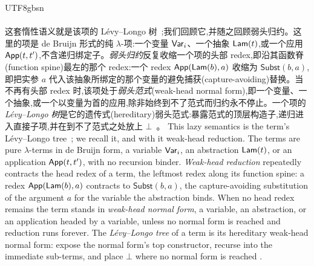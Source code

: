 \begin{CJK*}{UTF8}{gbsn}
  \paragraph{}
  \ifTablambdaChinese
  这套惰性语义就是该项的 Lévy--Longo 树~\cite{longo1983-set-theoretical-models, levy1978-reductions-lambda-calcul};我们回顾它,并随之回顾弱头归约。这里的项是 de Bruijn 形式的纯 $\lambda$-项:一个变量 $\mathsf{Var}_i$、一个抽象 $\mathsf{Lam}(t)$,或一个应用 $\mathsf{App}(t, t')$,不含递归绑定子。\emph{弱头归约}反复收缩一个项的头部 redex,即沿其函数脊(function spine)最左的那个 redex:一个 redex $\mathsf{App}(\mathsf{Lam}(b), a)$ 收缩为 $\textsf{Subst}(b, a)$,即把实参 $a$ 代入该抽象所绑定的那个变量的避免捕获(capture-avoiding)替换。当不再有头部 redex 时,该项处于\emph{弱头范式}(weak-head normal form),即一个变量、一个抽象,或一个以变量为首的应用,除非始终到不了范式而归约永不停止。一个项的 \emph{Lévy--Longo 树}是它的遗传式(hereditary)弱头范式:暴露范式的顶层构造子,递归进入直接子项,并在到不了范式之处放上 $\bot$~\cite{barendregt1984-lambda-calculus, wadsworth1971-semantics-lambda-calculus, abramsky1993-full-abstraction-lazy-lambda}。
  \else
  This lazy semantics is the term's L\'evy--Longo tree~\cite{longo1983-set-theoretical-models, levy1978-reductions-lambda-calcul}; we recall it, and with it weak-head reduction. The terms are pure $\lambda$-terms in de Bruijn form, a variable $\mathsf{Var}_i$, an abstraction $\mathsf{Lam}(t)$, or an application $\mathsf{App}(t, t')$, with no recursion binder. \emph{Weak-head reduction} repeatedly contracts the head redex of a term, the leftmost redex along its function spine: a redex $\mathsf{App}(\mathsf{Lam}(b), a)$ contracts to $\textsf{Subst}(b, a)$, the capture-avoiding substitution of the argument $a$ for the variable the abstraction binds. When no head redex remains the term stands in \emph{weak-head normal form}, a variable, an abstraction, or an application headed by a variable, unless no normal form is reached and reduction runs forever. The \emph{L\'evy--Longo tree} of a term is its hereditary weak-head normal form: expose the normal form's top constructor, recurse into the immediate sub-terms, and place $\bot$ where no normal form is reached \cite{barendregt1984-lambda-calculus, wadsworth1971-semantics-lambda-calculus, abramsky1993-full-abstraction-lazy-lambda}.
  \fi


\end{CJK*}
